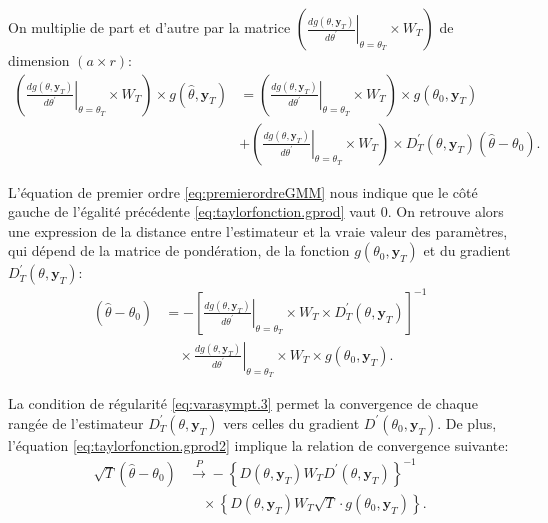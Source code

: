 On multiplie de part et d'autre par la matrice $
\left(\left.\frac{dg(\theta,\mathbf{y}_{T})}{d\theta^{\prime}}\right|_{\theta=\theta_T}
  \times W_T \right)$ de dimension $(a \times r)$:
\begin{align}
  \label{eq:taylorfonction.gprod}
  \left(\left.\frac{dg(\theta,\mathbf{y}_{T})}{d\theta^{\prime}}\right|_{\theta=\theta_T}
    \times W_T\right) \times g(\hat\theta,\mathbf{y}_{T}) &=
  \left(\left.\frac{dg(\theta,\mathbf{y}_{T})}{d\theta^{\prime}}\right|_{\theta=\theta_T}
    \times W_T\right) \times g(\theta_0,\mathbf{y}_{T})\nonumber\\
  &+
  \left(\left.\frac{dg(\theta,\mathbf{y}_{T})}{d\theta^{\prime}}\right|_{\theta=\theta_T}
    \times W_T\right) \times D^{\prime}_T(\theta,\mathbf{y}_{T})
  \left(\hat\theta-\theta_0 \right).
\end{align}

L'équation de premier ordre \eqref{eq:premierordreGMM} nous indique
que le côté gauche de l'égalité précédente
\eqref{eq:taylorfonction.gprod} vaut 0. On retrouve alors une
expression de la distance entre l'estimateur et la vraie valeur des
paramètres, qui dépend de la matrice de pondération, de la fonction
$g(\theta_0,\mathbf{y}_{T})$ et du gradient
$D^{\prime}_T(\theta,\mathbf{y}_{T})$:
\begin{align}
  \label{eq:taylorfonction.gprod2}
  \left(\hat\theta-\theta_0 \right) &= -
  \left[\left.\frac{dg(\theta,\mathbf{y}_{T})}{d\theta^{\prime}}\right|_{\theta=\theta_T}
    \times W_T \times D^{\prime}_T(\theta,\mathbf{y}_{T}) \right]^{-1} \nonumber\\
  &\quad\times
  \left.\frac{dg(\theta,\mathbf{y}_{T})}{d\theta^{\prime}}\right|_{\theta=\theta_T}
  \times W_T \times g(\theta_0,\mathbf{y}_{T}).
\end{align}

La condition de régularité \eqref{eq:varasympt.3} permet la
convergence de chaque rangée de l'estimateur
$D^{\prime}_T(\theta,\mathbf{y}_{T})$ vers celles du gradient
$D^{\prime}(\theta_0,\mathbf{y}_{T})$. De plus, l'équation
\eqref{eq:taylorfonction.gprod2} implique la relation de convergence
suivante:
\begin{align}
  \label{eq:taylorfonction.gprod3}
  \sqrt{T} \left(\hat\theta-\theta_0 \right)
  &\stackrel{P}{\longrightarrow}
  -\left\{D(\theta,\mathbf{y}_{T})W_TD^{\prime}(\theta,\mathbf{y}_{T})
  \right\}^{-1} \nonumber\\
  &\quad\times \left\{D(\theta,\mathbf{y}_{T})W_T\sqrt{T} \cdot
    g(\theta_0,\mathbf{y}_{T}) \right\}.
\end{align}

